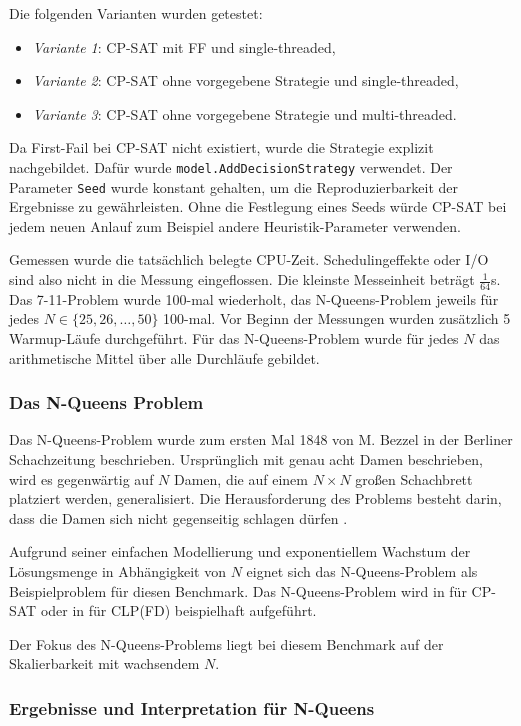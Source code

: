 \documentclass[12pt,a4paper]{article}
\begin{document}
\noindent
Die folgenden Varianten wurden getestet:
\begin{itemize}
    \item \emph{Variante 1}: CP-SAT mit FF und single-threaded,
    \item \emph{Variante 2}: CP-SAT ohne vorgegebene Strategie und single-threaded,
    \item \emph{Variante 3}: CP-SAT ohne vorgegebene Strategie und multi-threaded.
\end{itemize}
\noindent
Da First-Fail bei CP-SAT nicht existiert, wurde die Strategie explizit nachgebildet.
Dafür wurde \verb|model.AddDecisionStrategy| verwendet.
Der Parameter \texttt{Seed} wurde konstant gehalten, um die Reproduzierbarkeit der Ergebnisse zu gewährleisten.
Ohne die Festlegung eines Seeds würde CP-SAT bei jedem neuen Anlauf zum Beispiel andere Heuristik-Parameter verwenden.

Gemessen wurde die tatsächlich belegte CPU-Zeit.
Schedulingeffekte oder I/O sind also nicht in die Messung eingeflossen.
Die kleinste Messeinheit beträgt $\frac{1}{64}$s.
Das 7-11-Problem wurde 100-mal wiederholt, das N-Queens-Problem jeweils für jedes $N \in \{25,26,\dots,50\}$ 100-mal.
Vor Beginn der Messungen wurden zusätzlich 5 Warmup-Läufe durchgeführt.
Für das N-Queens-Problem wurde für jedes $N$ das arithmetische Mittel über alle Durchläufe gebildet.
\subsubsection{Das N-Queens Problem}
Das N-Queens-Problem wurde zum ersten Mal 1848 von M. Bezzel in der Berliner Schachzeitung beschrieben.
Ursprünglich mit genau acht Damen beschrieben, wird es gegenwärtig auf $N$ Damen, die auf einem $N \times N$ großen Schachbrett platziert werden, generalisiert.
Die Herausforderung des Problems besteht darin, dass die Damen sich nicht gegenseitig schlagen dürfen \cite{nqueens}.

Aufgrund seiner einfachen Modellierung und exponentiellem Wachstum der Lösungsmenge in Abhängigkeit von $N$ eignet sich das N-Queens-Problem als Beispielproblem für diesen Benchmark.
Das N-Queens-Problem wird in \cite{ortools} für CP-SAT oder in \cite{drt} für CLP(FD) beispielhaft aufgeführt. 

Der Fokus des N-Queens-Problems liegt bei diesem Benchmark auf der Skalierbarkeit mit wachsendem $N$.
\subsubsection{Ergebnisse und Interpretation für N-Queens}
\end{document}
